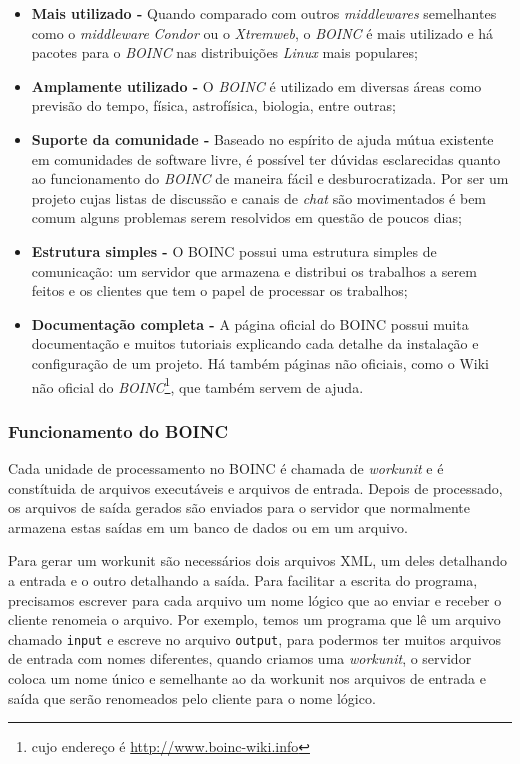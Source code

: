\begin{itemize}
  \item \textbf{Mais utilizado -} Quando comparado com outros \emph{middlewares} semelhantes como o \textit{middleware} 
\emph{Condor} ou o \emph{Xtremweb}, o \emph{BOINC} é mais utilizado e há pacotes para o \emph{BOINC} nas 
distribuições \emph{Linux} mais populares;
  \item \textbf{Amplamente utilizado -} O \emph{BOINC} é utilizado em diversas áreas como previsão do tempo, física,
astrofísica, biologia, entre outras;
  \item \textbf{Suporte da comunidade -} Baseado no espírito de ajuda mútua existente em comunidades de software livre, é 
possível ter dúvidas esclarecidas quanto ao funcionamento do \emph{BOINC} de maneira fácil e desburocratizada. Por ser um projeto
cujas listas de discussão e canais de \textit{chat} são movimentados é bem comum alguns problemas serem resolvidos em questão de 
poucos dias;
  \item \textbf{Estrutura simples -} O BOINC possui uma estrutura simples de comunicação: um servidor que armazena e 
distribui os trabalhos a serem feitos e os clientes que tem o papel de processar os trabalhos;
  \item \textbf{Documentação completa -} A página oficial do BOINC possui muita documentação e muitos tutoriais explicando
cada detalhe da instalação e configuração de um projeto. Há também páginas não oficiais, como o Wiki não oficial do \emph{BOINC}\footnote{cujo endereço é \url{http://www.boinc-wiki.info}},
que também servem de ajuda.
\end{itemize}



\subsubsection{Funcionamento do BOINC}


Cada unidade de processamento no BOINC é chamada de \emph{workunit} e é constítuida de arquivos executáveis e 
arquivos de entrada. Depois de processado, os arquivos de saída gerados são enviados para o servidor que
normalmente armazena estas saídas em um banco de dados ou em um arquivo.

Para gerar um workunit são necessários dois arquivos XML, um deles detalhando a entrada e o 
outro detalhando a saída. Para facilitar a escrita do programa, precisamos escrever para cada arquivo um nome lógico 
que ao enviar e receber o cliente renomeia o arquivo. Por exemplo, temos um programa que lê um arquivo chamado 
\verb#input# e escreve no arquivo \verb#output#, para podermos ter muitos arquivos de entrada com nomes diferentes, quando
criamos uma \emph{workunit}, o servidor coloca um nome único e semelhante ao da workunit nos arquivos de entrada e saída que serão renomeados
pelo cliente para o nome lógico.

